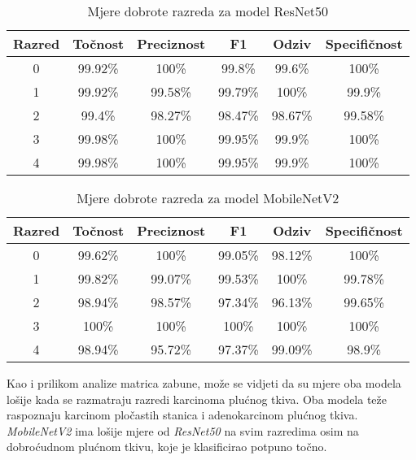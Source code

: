 \documentclass[conference, utf8]{IEEEtran}
\begin{document}
	
	\begin{table}[H]
		\centering
		\caption{Mjere dobrote razreda za model ResNet50}
		\label{table:4}
		\begin{tabular}{ |c|c|c|c|c|c| } 
			\hline
			Razred & Točnost & Preciznost & F1 & Odziv & Specifičnost \\
			\hline\hline
			0 & 99.92\% & 100\% & 99.8\% & 99.6\% & 100\% \\
			\hline
			1 & 99.92\% & 99.58\% & 99.79\% & 100\% & 99.9\% \\
			\hline
			2 & 99.4\% & 98.27\% & 98.47\% & 98.67\% & 99.58\% \\
			\hline
			3 & 99.98\% & 100\% & 99.95\% & 99.9\% & 100\% \\
			\hline
			4 & 99.98\% & 100\% & 99.95\% & 99.9\% & 100\% \\
			\hline
		\end{tabular}
	\end{table}
	\begin{table}[H]
		\centering
		\caption{Mjere dobrote razreda za model MobileNetV2}
		\label{table:5}
		\begin{tabular}{ |c|c|c|c|c|c| } 
			\hline
			Razred & Točnost & Preciznost & F1 & Odziv & Specifičnost \\
			\hline\hline
			0 & 99.62\% & 100\% & 99.05\% & 98.12\% & 100\% \\
			\hline
			1 & 99.82\% & 99.07\% & 99.53\% & 100\% & 99.78\% \\
			\hline
			2 & 98.94\% & 98.57\% & 97.34\% & 96.13\% & 99.65\% \\
			\hline
			3 & 100\% & 100\% & 100\% & 100\% & 100\% \\
			\hline
			4 & 98.94\% & 95.72\% & 97.37\% & 99.09\% & 98.9\% \\
			\hline
		\end{tabular}
	\end{table}
	
	Kao i prilikom analize matrica zabune, može se vidjeti da su mjere oba modela lošije kada se razmatraju razredi karcinoma plućnog tkiva. Oba modela teže raspoznaju karcinom pločastih stanica i adenokarcinom plućnog tkiva. \textit{MobileNetV2} ima lošije mjere od \textit{ResNet50} na svim razredima osim na dobroćudnom plućnom tkivu, koje je klasificirao potpuno točno. 
	
\end{document}
